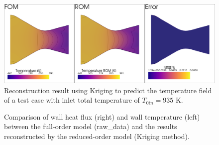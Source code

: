 \documentclass[10pt,fleqn,a4paper,twoside]{article}
\begin{document}
\begin{figure}[!ht]
	\begin{center}
		\includegraphics[width=\textwidth]{images/kriging_test_2d.png}
		\newline
		\caption{Reconstruction result using Kriging to predict the temperature field of a test case with inlet total temperature of $T_{0in}=935$ K.}
    \label{fig:krigingtest}
	\end{center}  
\end{figure}

\begin{figure}[!ht]%
    \centering
    \qquad
    \caption{Comparison of wall heat flux (right) and wall temperature (left) between the full-order model (raw\_data) and the results reconstructed by the reduced-order model (Kriging method).}
    \label{fig:krigingwall}%
\end{figure}
\end{document}
